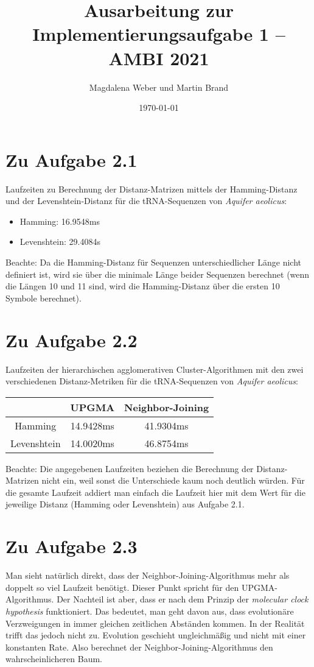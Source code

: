 \documentclass[a4paper,12pt]{article}
\begin{document}
\title{Ausarbeitung zur Implementierungsaufgabe 1 -- AMBI 2021}
\author
{Magdalena Weber und Martin Brand}
\date{\today}
\maketitle


\section*{Zu Aufgabe 2.1}
\label{section:aufgabe1}
Laufzeiten zu Berechnung der Distanz-Matrizen mittels der Hamming-Distanz und der Levenshtein-Distanz für die tRNA-Sequenzen von \textit{Aquifer aeolicus}:

\begin{itemize}
    \item Hamming: 16.9548ms
    \item Levenshtein: 29.4084s
\end{itemize}
Beachte: Da die Hamming-Distanz für Sequenzen unterschiedlicher Länge nicht definiert ist, wird sie über die minimale Länge beider Sequenzen berechnet (wenn die Längen 10 und 11 sind, wird die Hamming-Distanz über die ersten 10 Symbole berechnet).


\section*{Zu Aufgabe 2.2}
\label{section:aufgabe2}
Laufzeiten der hierarchischen agglomerativen Cluster-Algorithmen mit den zwei verschiedenen Distanz-Metriken für die tRNA-Sequenzen von \textit{Aquifer aeolicus}: \newline 
\newline
\begin{tabular}{c|c|c}
     &  UPGMA & Neighbor-Joining \\
    \hline
    Hamming & 14.9428ms & 41.9304ms \\
    Levenshtein & 14.0020ms & 46.8754ms
\end{tabular}
\newline \newline
Beachte: Die angegebenen Laufzeiten beziehen die Berechnung der Distanz-Matrizen nicht ein, weil sonst die Unterschiede kaum noch deutlich würden. Für die gesamte Laufzeit addiert man einfach die Laufzeit hier mit dem Wert für die jeweilige Distanz (Hamming oder Levenshtein) aus Aufgabe 2.1. 

\section*{Zu Aufgabe 2.3}
Man sieht natürlich direkt, dass der Neighbor-Joining-Algorithmus mehr als doppelt so viel Laufzeit benötigt. Dieser Punkt spricht für den UPGMA-Algorithmus. 
\newline
Der Nachteil ist aber, dass er nach dem Prinzip der \textit{molecular clock hypothesis} funktioniert. Das bedeutet, man geht davon aus, dass evolutionäre Verzweigungen in immer gleichen zeitlichen Abständen kommen. In der Realität trifft das jedoch nicht zu. Evolution geschieht ungleichmäßig und nicht mit einer konstanten Rate. Also berechnet der Neighbor-Joining-Algorithmus den wahrscheinlicheren Baum.
\end{document}
